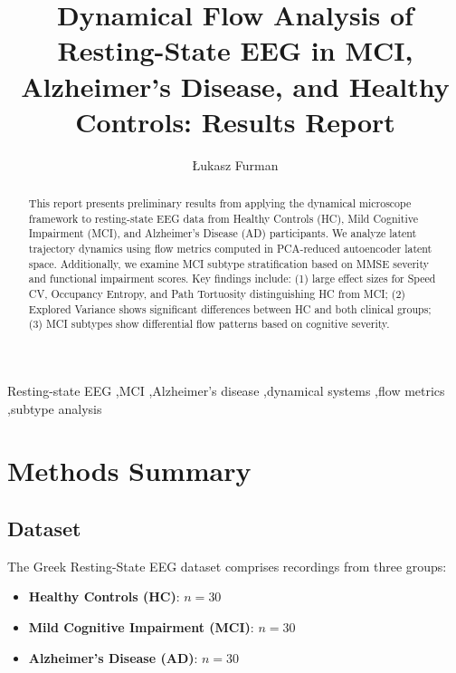 \documentclass[5p,twocolumn,authoryear]{elsarticle}
\begin{document}
\begin{frontmatter}

\title{Dynamical Flow Analysis of Resting-State EEG in MCI, Alzheimer's Disease, and Healthy Controls: Results Report}

\author[1]{\L{}ukasz Furman}

\address[1]{Faculty of Physics, Astronomy and Informatics, Nicolaus Copernicus University, 87-100, Toru\'{n}, Poland}

\begin{abstract}
This report presents preliminary results from applying the dynamical microscope framework to resting-state EEG data from Healthy Controls (HC), Mild Cognitive Impairment (MCI), and Alzheimer's Disease (AD) participants. We analyze latent trajectory dynamics using flow metrics computed in PCA-reduced autoencoder latent space. Additionally, we examine MCI subtype stratification based on MMSE severity and functional impairment scores. Key findings include: (1) large effect sizes for Speed CV, Occupancy Entropy, and Path Tortuosity distinguishing HC from MCI; (2) Explored Variance shows significant differences between HC and both clinical groups; (3) MCI subtypes show differential flow patterns based on cognitive severity.
\end{abstract}

\begin{keyword}
Resting-state EEG \sep MCI \sep Alzheimer's disease \sep dynamical systems \sep flow metrics \sep subtype analysis
\end{keyword}

\end{frontmatter}

\section{Methods Summary}

\subsection{Dataset}

The Greek Resting-State EEG dataset comprises recordings from three groups:
\begin{itemize}
    \item \textbf{Healthy Controls (HC)}: $n = 30$
    \item \textbf{Mild Cognitive Impairment (MCI)}: $n = 30$
    \item \textbf{Alzheimer's Disease (AD)}: $n = 30$
\end{itemize}
\end{document}

